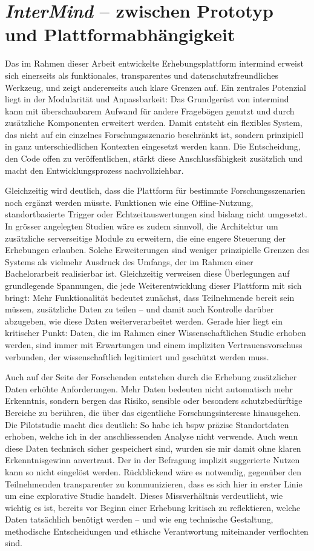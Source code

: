 \section{\textit{InterMind} -- zwischen Prototyp und Plattformabhängigkeit}

Das im Rahmen dieser Arbeit entwickelte Erhebungsplattform \gls{intermind} erweist sich einerseits als funktionales, transparentes und datenschutzfreundliches Werkzeug, und zeigt andererseits auch klare Grenzen auf. Ein zentrales Potenzial liegt in der Modularität und Anpassbarkeit: Das Grundgerüst von \gls{intermind} kann mit überschaubarem Aufwand für andere Fragebögen genutzt und durch zusätzliche Komponenten erweitert werden. Damit entsteht ein flexibles System, das nicht auf ein einzelnes Forschungsszenario beschränkt ist, sondern prinzipiell in ganz unterschiedlichen Kontexten eingesetzt werden kann. Die Entscheidung, den Code offen zu veröffentlichen, stärkt diese Anschlussfähigkeit zusätzlich und macht den Entwicklungsprozess nachvollziehbar.

Gleichzeitig wird deutlich, dass die Plattform für bestimmte Forschungsszenarien noch ergänzt werden müsste. Funktionen wie eine Offline-Nutzung, standortbasierte Trigger oder Echtzeitauswertungen sind bislang nicht umgesetzt. In grösser angelegten Studien wäre es zudem sinnvoll, die Architektur um zusätzliche serverseitige Module zu erweitern, die eine engere Steuerung der Erhebungen erlauben. Solche Erweiterungen sind weniger prinzipielle Grenzen des Systems als vielmehr Ausdruck des Umfangs, der im Rahmen einer Bachelorarbeit realisierbar ist. Gleichzeitig verweisen diese Überlegungen auf grundlegende Spannungen, die jede Weiterentwicklung dieser Plattform mit sich bringt: Mehr Funktionalität bedeutet zunächst, dass Teilnehmende bereit sein müssen, zusätzliche Daten zu teilen -- und damit auch Kontrolle darüber abzugeben, wie diese Daten weiterverarbeitet werden. Gerade hier liegt ein kritischer Punkt: Daten, die im Rahmen einer Wissenschaftlichen Studie erhoben werden, sind immer mit Erwartungen und einem impliziten Vertrauensvorschuss verbunden, der wissenschaftlich legitimiert und geschützt werden muss.

Auch auf der Seite der Forschenden entstehen durch die Erhebung zusätzlicher Daten erhöhte Anforderungen. Mehr Daten bedeuten nicht automatisch mehr Erkenntnis, sondern bergen das Risiko, sensible oder besonders schutzbedürftige Bereiche zu berühren, die über das eigentliche Forschungsinteresse hinausgehen. Die Pilotstudie macht dies deutlich: So habe ich \gls{bspw} präzise Standortdaten erhoben, welche ich in der anschliessenden Analyse nicht verwende. Auch wenn diese Daten technisch sicher gespeichert sind, wurden sie mir damit ohne klaren Erkenntnisgewinn anvertraut. Der in der Befragung implizit suggerierte Nutzen kann so nicht eingelöst werden. Rückblickend wäre es notwendig, gegenüber den Teilnehmenden transparenter zu kommunizieren, dass es sich hier in erster Linie um eine explorative Studie handelt. Dieses Missverhältnis verdeutlicht, wie wichtig es ist, bereits vor Beginn einer Erhebung kritisch zu reflektieren, welche Daten tatsächlich benötigt werden -- und wie eng technische Gestaltung, methodische Entscheidungen und ethische Verantwortung miteinander verflochten sind.


